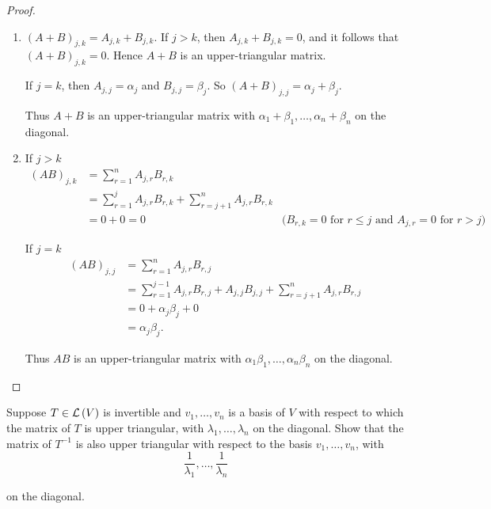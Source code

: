 \begin{proof}
    \begin{enumerate}[label={(\alph*)}]
        \item ${(A + B)}_{j,k} = A_{j,k} + B_{j,k}$. If $j > k$, then $A_{j,k} + B_{j,k} = 0$, and it follows that ${(A + B)}_{j,k} = 0$. Hence $A + B$ is an upper-triangular matrix.

              If $j = k$, then $A_{j,j} = \alpha_{j}$ and $B_{j,j} = \beta_{j}$. So ${(A + B)}_{j,j} = \alpha_{j} + \beta_{j}$.

              Thus $A + B$ is an upper-triangular matrix with $\alpha_{1} + \beta_{1}, \ldots, \alpha_{n} + \beta_{n}$ on the diagonal.
        \item If $j > k$
              \begin{align*}
                  {(AB)}_{j,k} & = \sum^{n}_{r=1}A_{j,r}B_{r,k}                                                                                                       \\
                               & = \sum^{j}_{r=1}A_{j,r}B_{r,k} + \sum^{n}_{r=j+1}A_{j,r}B_{r,k}                                                                      \\
                               & = 0 + 0 = 0                                                     & \text{($B_{r,k} = 0$ for $r\leq j$ and $A_{j,r} = 0$ for $r > j$)}
              \end{align*}

              If $j = k$
              \begin{align*}
                  {(AB)}_{j,j} & = \sum^{n}_{r=1}A_{j,r}B_{r,j}                                                     \\
                               & = \sum^{j-1}_{r=1}A_{j,r}B_{r,j} + A_{j,j}B_{j,j} + \sum^{n}_{r=j+1}A_{j,r}B_{r,j} \\
                               & = 0 + \alpha_{j}\beta_{j} + 0                                                      \\
                               & = \alpha_{j}\beta_{j}.
              \end{align*}

              Thus $AB$ is an upper-triangular matrix with $\alpha_{1}\beta_{1}, \ldots, \alpha_{n}\beta_{n}$ on the diagonal.
    \end{enumerate}
\end{proof}
\newpage

\begin{exercise}
    Suppose $T \in \mathcal{L}\left({V}\right)$ is invertible and $v_{1}, \ldots, v_{n}$ is a basis of $V$ with respect to which the matrix of $T$ is upper triangular, with $\lambda_{1} , \ldots, \lambda_{n}$ on the diagonal. Show that the matrix of $T^{-1}$ is also upper triangular with respect to the basis $v_{1}, \ldots, v_{n}$, with
    \[
        \frac{1}{\lambda_{1}}, \ldots, \frac{1}{\lambda_{n}}
    \]

    on the diagonal.
\end{exercise}

